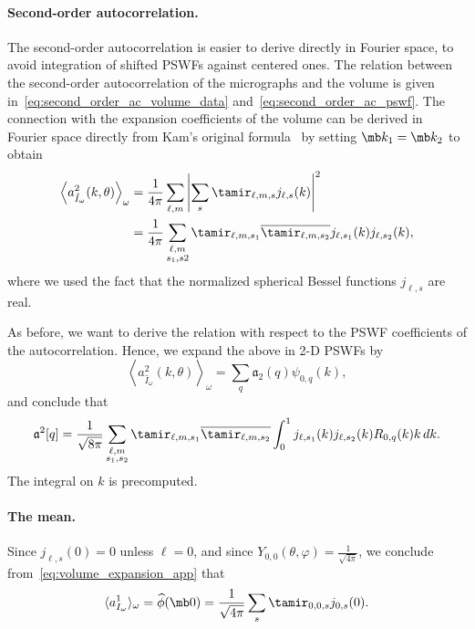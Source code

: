 \documentclass[9pt,twocolumn,twoside,lineno]{pnas-new}
\begin{document}
\paragraph{Second-order autocorrelation.}
The second-order autocorrelation is easier to derive directly in Fourier space, to avoid integration of shifted PSWFs against centered ones. 
The relation between the second-order autocorrelation of the micrographs and the volume is given in~\eqref{eq:second_order_ac_volume_data} and~\eqref{eq:second_order_ac_pswf}. 
The connection with the expansion coefficients of the volume can be derived in  Fourier space directly from Kam's
original formula~\cite{kam1980reconstruction} by setting $\mb k_1 = \mb k_2$ to
obtain
\begin{align*}
\left\langle a^2_{\hat{I}_{\omega}}(k,\theta)\right\rangle_{\omega} &=
\frac{1}{4\pi}\sum_{\ell,
	m}\left|\sum_s\tamir_{\ell,m,s}j_{\ell,s}(k)\right|^2 \\&=
\frac{1}{4\pi}\sum_{\substack{\ell,m\\s_1,s2}}\tamir_{\ell,m,s_1}\overline{\tamir_{\ell,m,s_2}}j_{\ell,s_1}(k)j_{\ell,s_2}(k),
\end{align*}
where we used the fact that the normalized spherical Bessel functions
$j_{\ell,s}$ are real. 

As before, we want to derive the relation with respect to the PSWF coefficients of the autocorrelation. Hence,  we expand the above in 2-D PSWFs by
\[\left\langle a^2_{\hat{I}_{\omega}}(k,\theta)\right\rangle_{\omega} =
\sum_{q}\mathfrak{a}_2(q)\psi_{0,q}(k),\]
and conclude that
\[ \mathfrak{a}^2[q] =
\frac{1}{\sqrt{8\pi}}\sum_{\substack{\ell,m\\s_1,s_2}}\tamir_{\ell,m,s_1}\overline{\tamir_{\ell,m,s_2}}
\int_0^1j_{\ell,s_1}(k)j_{\ell,s_2}(k)R_{0,q}(k)k\, dk.\]
The integral on $k$ is precomputed.

\paragraph{The mean.}

Since $j_{\ell,s}(0) = 0$ unless $\ell=0$, and since
$Y_{0,0}(\theta,\varphi) = \frac{1}{\sqrt{4\pi}}$, we conclude from~\eqref{eq:volume_expansion_app} that
\[ \langle
a^1_{I_{\omega}}\rangle_{\omega} = \widehat \phi(\mb 0) = \frac{1}{\sqrt{4\pi}}\sum_s\tamir_{0,0,s}j_{0,s}(0).\]
\end{document}
